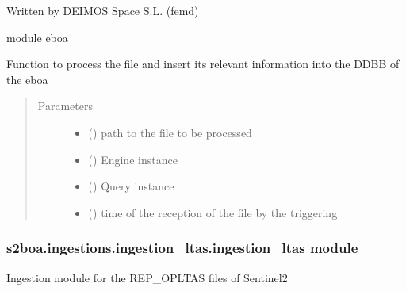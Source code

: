 Written by DEIMOS Space S.L. (femd)

module eboa

\begin{fulllineitems}
\label{\detokenize{s2boa.ingestions:s2boa.ingestions.ingestion_lta.ingestion_lta.process_file}}
Function to process the file and insert its relevant information
into the DDBB of the eboa
\begin{quote}\begin{description}
\item[{Parameters}] \leavevmode\begin{itemize}
\item {} 
 () \textendash{} path to the file to be processed

\item {} 
 () \textendash{} Engine instance

\item {} 
 () \textendash{} Query instance

\item {} 
 () \textendash{} time of the reception of the file by the triggering

\end{itemize}

\end{description}\end{quote}

\end{fulllineitems}



\subsubsection{s2boa.ingestions.ingestion\_ltas.ingestion\_ltas module}
\label{\detokenize{s2boa.ingestions:module-s2boa.ingestions.ingestion_ltas.ingestion_ltas}}\label{\detokenize{s2boa.ingestions:s2boa-ingestions-ingestion-ltas-ingestion-ltas-module}}
Ingestion module for the REP\_OPLTAS files of Sentinel\sphinxhyphen{}2


